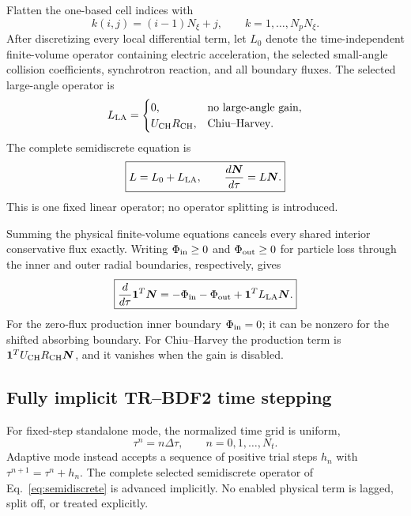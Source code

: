 \documentclass[11pt]{article}
\begin{document}
Flatten the one-based cell indices with
\begin{equation}
 k(i,j)=(i-1)N_\xi+j,
 \qquad k=1,\ldots,N_pN_\xi.
 \label{eq:flattening}
\end{equation}
After discretizing every local differential term, let $L_0$ denote the time-independent
finite-volume operator containing electric acceleration, the selected small-angle
collision coefficients, synchrotron reaction, and all boundary fluxes.  The selected
large-angle operator is
\begin{equation}
 L_{\rm LA}=\begin{cases}
 0, & \text{no large-angle gain},\\
 U_{\rm CH}R_{\rm CH}, & \text{Chiu--Harvey}.
 \end{cases}
 \label{eq:large_angle_discrete_choices}
\end{equation}
The complete semidiscrete equation is
\begin{equation}
 \boxed{
 L=L_0+L_{\rm LA},\qquad
 \frac{d\bm N}{d\tau}=L\bm N.
 }
 \label{eq:semidiscrete}
\end{equation}
This is one fixed linear operator; no operator splitting is introduced.

Summing the physical finite-volume equations cancels every shared interior conservative
flux exactly.  Writing $\Phi_{\rm in}\ge0$ and $\Phi_{\rm out}\ge0$ for particle loss
through the inner and outer radial boundaries, respectively, gives
\begin{equation}
 \boxed{
 \frac{d}{d\tau}\bm 1^T\bm N
 =-\Phi_{\rm in}-\Phi_{\rm out}+\bm 1^TL_{\rm LA}\bm N.
 }
 \label{eq:discrete_particle_balance}
\end{equation}
For the zero-flux production inner boundary $\Phi_{\rm in}=0$; it can be nonzero for the
shifted absorbing boundary.  For Chiu--Harvey the production term is
$\bm1^TU_{\rm CH}R_{\rm CH}\bm N$, and it vanishes when the gain is disabled.

\subsection{Fully implicit TR--BDF2 time stepping}

For fixed-step standalone mode, the normalized time grid is uniform,
\begin{equation}
 \tau^n=n\Delta\tau,\qquad n=0,1,\ldots,N_t.
 \label{eq:uniform_time_grid}
\end{equation}
Adaptive mode instead accepts a sequence of positive trial steps $h_n$ with
$\tau^{n+1}=\tau^n+h_n$.  The complete selected semidiscrete operator of
Eq.~\eqref{eq:semidiscrete} is advanced implicitly.  No enabled physical term is
lagged, split off, or treated explicitly.
\end{document}
